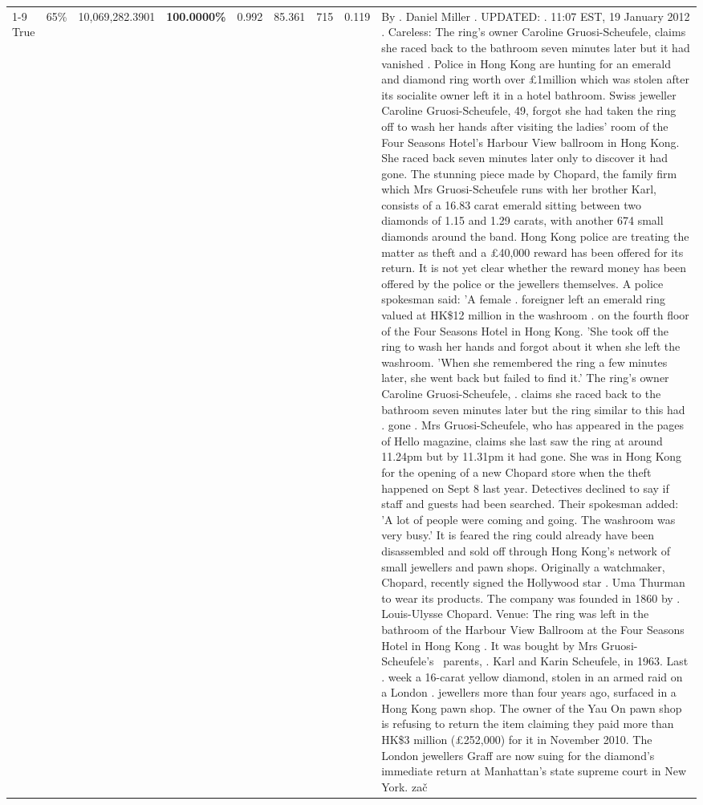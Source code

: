 \begin{table}[H]
\begin{tabular}{lllrlllll}
\cline{1-9} \cline{2-9}
True & 65\% & 10,069,282.3901 & \bfseries \color{red} 100.0000\% & 0.992 & 85.361 & 715 & 0.119 & By . Daniel Miller . UPDATED: . 11:07 EST, 19 January 2012 . Careless: The ring's owner Caroline Gruosi-Scheufele, claims she raced back to the bathroom seven minutes later but it had vanished . Police in Hong Kong are hunting for an emerald and diamond ring worth over £1million which was stolen after its socialite owner left it in a hotel bathroom. Swiss jeweller Caroline Gruosi-Scheufele, 49, forgot she had taken the ring off to wash her hands after visiting the ladies' room of the Four Seasons Hotel's Harbour View ballroom in Hong Kong. She raced back seven minutes later only to discover it had gone. The stunning piece made by Chopard, the family firm which Mrs Gruosi-Scheufele runs with her brother Karl, consists of a 16.83 carat emerald sitting between two diamonds of 1.15 and 1.29 carats, with another 674 small diamonds around the band. Hong Kong police are treating the matter as theft and a £40,000 reward has been offered for its return. It is not yet clear whether the reward money has been offered by the police or the jewellers themselves. A police spokesman said: 'A female . foreigner left an emerald ring valued at HK\$12 million in the washroom . on the fourth floor of the Four Seasons Hotel in Hong Kong. 'She took off the ring to wash her hands and forgot about it when she left the washroom. 'When she remembered the ring a few minutes later, she went back but failed to find it.' The ring's owner Caroline Gruosi-Scheufele, . claims she raced back to the bathroom seven minutes later but the ring similar to this had . gone . Mrs Gruosi-Scheufele, who has appeared in the pages of Hello magazine, claims she last saw the ring at around 11.24pm but by 11.31pm it had gone. She was in Hong Kong for the opening of a new Chopard store when the theft happened on Sept 8 last year. Detectives declined to say if staff and guests had been searched. Their spokesman added: 'A lot of people were coming and going. The washroom was very busy.' It is feared the ring could already have been disassembled and sold off through Hong Kong's network of small jewellers and pawn shops. Originally a watchmaker, Chopard, recently signed the Hollywood star . Uma Thurman to wear its products. The company was founded in 1860 by . Louis-Ulysse Chopard. Venue: The ring was left in the bathroom of the Harbour View Ballroom at the Four Seasons Hotel in Hong Kong . It was bought by Mrs Gruosi-Scheufele's  parents, . Karl and Karin Scheufele, in 1963. Last . week a 16-carat yellow diamond, stolen in an armed raid on a London . jewellers more than four years ago, surfaced in a Hong Kong pawn shop. The owner of the Yau On pawn shop is refusing to return the item claiming they paid more than HK\$3 million (£252,000) for it in November 2010. The London jewellers Graff are now suing for the diamond’s immediate return at Manhattan’s state supreme court in New York. zač \\

\end{tabular}
\end{table}
